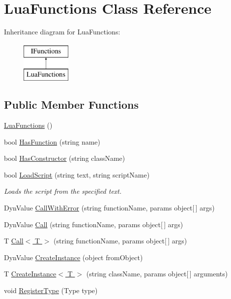 \hypertarget{class_lua_functions}{}\section{Lua\+Functions Class Reference}
\label{class_lua_functions}
Inheritance diagram for Lua\+Functions\+:\begin{figure}[H]
\begin{center}
\leavevmode
\includegraphics[height=2.000000cm]{class_lua_functions}
\end{center}
\end{figure}
\subsection*{Public Member Functions}
\begin{DoxyCompactItemize}
\item 
\hyperlink{class_lua_functions_ab3e8e3948a49cde556fa27f93a68d0db}{Lua\+Functions} ()
\item 
bool \hyperlink{class_lua_functions_a1bcc0469b7501e9e949e0575aba7fb80}{Has\+Function} (string name)
\item 
bool \hyperlink{class_lua_functions_a308710875bcf9a6d4a8513029922a766}{Has\+Constructor} (string class\+Name)
\item 
bool \hyperlink{class_lua_functions_af17a439c6a875a777b9b2e5bc3f5c072}{Load\+Script} (string text, string script\+Name)
\begin{DoxyCompactList}\small\item\em Loads the script from the specified text. \end{DoxyCompactList}\item 
Dyn\+Value \hyperlink{class_lua_functions_a8fcb93802ded2a89af4ce20efef82a70}{Call\+With\+Error} (string function\+Name, params object\mbox{[}$\,$\mbox{]} args)
\item 
Dyn\+Value \hyperlink{class_lua_functions_a8662db102890d5b12fada540482c51eb}{Call} (string function\+Name, params object\mbox{[}$\,$\mbox{]} args)
\item 
T \hyperlink{class_lua_functions_ac1bbf0ec272f91f4322e89796deadf52}{Call$<$ T $>$} (string function\+Name, params object\mbox{[}$\,$\mbox{]} args)
\item 
Dyn\+Value \hyperlink{class_lua_functions_a48e53ec3f02676d03050066fd3555d12}{Create\+Instance} (object from\+Object)
\item 
T \hyperlink{class_lua_functions_a920ae8303f3acff9b271c68889ca7ee5}{Create\+Instance$<$ T $>$} (string class\+Name, params object\mbox{[}$\,$\mbox{]} arguments)
\item 
void \hyperlink{class_lua_functions_ab3693345e8576e3f1cb5874531b10626}{Register\+Type} (Type type)
\end{DoxyCompactItemize}
